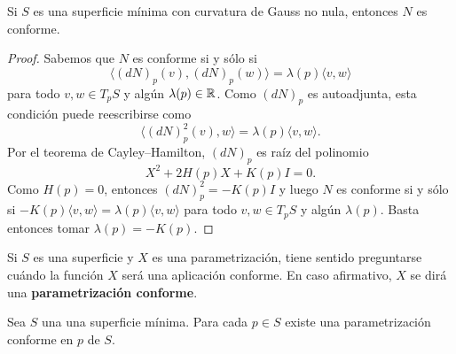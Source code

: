 \begin{theorem}
	Si $S$ es una superficie mínima con curvatura de Gauss no nula, entonces
	$N$ es conforme.
\end{theorem}

\begin{proof}
	Sabemos que $N$ es conforme si y sólo si 
	\[
	\langle
	(dN)_p(v),(dN)_p(w)\rangle=\lambda(p)\langle v,w\rangle
	\]
	para todo $v,w\in
	T_pS$ y algún $\lambda(p)\in\mathbb{R}$. Como $(dN)_p$ es autoadjunta, 
	esta condición puede reescribirse como
	\[
		\langle (dN)_p^2(v),w\rangle=\lambda(p)\langle v,w\rangle.
	\]
	Por el teorema de Cayley--Hamilton, $(dN)_p$ es raíz del polinomio
	\[
		X^2+2H(p)X+K(p)I=0.
	\]
	Como $H(p)=0$, entonces $(dN)_p^2=-K(p)I$ y luego $N$ es conforme si y sólo
	si $-K(p)\langle v,w\rangle=\lambda(p)\langle v,w\rangle$ para todo $v,w\in
	T_pS$ y algún $\lambda(p)$. Basta entonces tomar $\lambda(p)=-K(p)$. 
\end{proof}

Si $S$ es una superficie y $X$ es una parametrización, tiene sentido preguntarse cuándo 
la función $X$ será una aplicación conforme. En caso afirmativo, $X$ se dirá una
\textbf{parametrización conforme}.

\begin{theorem}
	Sea $S$ una
	una superficie mínima. Para cada $p\in S$ existe una parametrización
	conforme en $p$ de $S$.
\end{theorem}

